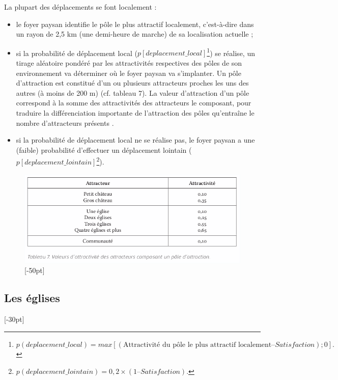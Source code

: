 La plupart des déplacements se font localement :
\begin{itemize}
	\item le foyer paysan identifie le pôle le plus attractif localement, c'est-à-dire dans un rayon de 2,5 km (une demi-heure de marche) de sa localisation actuelle ;
	\item si la probabilité de déplacement local ($p[deplacement\_local]$\footnote{
$p(deplacement\_local) = max[(\text{Attractivité du pôle le plus attractif localement} – Satisfaction) ; 0].$	
}) se réalise, un tirage aléatoire pondéré par les attractivités respectives des pôles de son environnement va déterminer où le foyer paysan va s'implanter.
	Un pôle d'attraction est constitué d'un ou plusieurs attracteurs proches les uns des autres (à moins de 200 m) (cf. tableau 7).
	La valeur d'attraction d'un pôle correspond à la somme des attractivités des attracteurs le composant, pour traduire la différenciation importante de l'attraction des pôles qu'entraîne le nombre d'attracteurs présents \autocite[tableau 13, p. 96]{zadora-rio_paroisses_2008}.
	\item si la probabilité de déplacement local ne se réalise pas, le foyer paysan a une (faible) probabilité d'effectuer un déplacement lointain ($p[deplacement\_lointain]$\footnote{
	$p(deplacement\_lointain) = 0,2 × (1 – Satisfaction)$.
}).
\end{itemize}

\begin{figure}[H]
\centering
\includegraphics[width=1\linewidth]{src/Chapitre_TMD/Tab7.png}
[-50pt]
\end{figure}

\subsection{Les églises}[-30pt]

